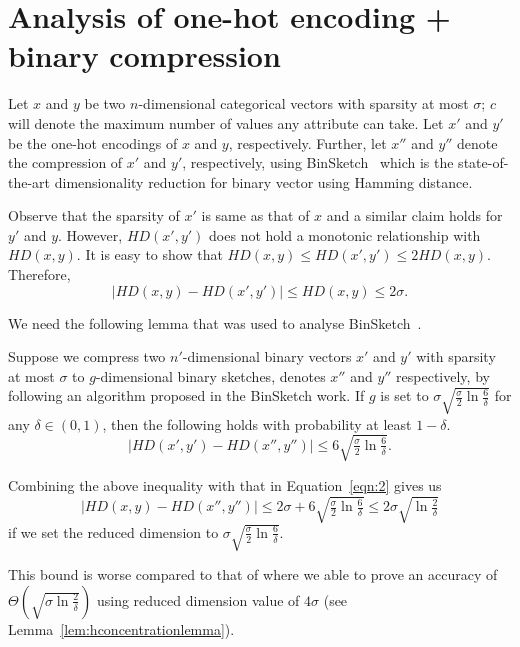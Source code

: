
\section{Analysis of one-hot encoding + binary compression}\label{appendix:OHE+BS}

Let $x$ and $y$ be two $n$-dimensional categorical vectors with sparsity at most $\sigma$; $c$ will denote the maximum number of values any attribute can take. Let $x'$ and $y'$ be the one-hot encodings of $x$ and $y$, respectively. Further, let $x''$ and $y''$ denote the compression of $x'$ and $y'$, respectively, using BinSketch~\cite{ICDM} which is the state-of-the-art dimensionality reduction for binary vector using Hamming distance.

Observe that the sparsity of $x'$ is same as that of $x$ and a similar claim holds for $y'$ and $y$. However, $HD(x',y')$ does not hold a monotonic relationship with $HD(x,y)$. %
It is easy to show that $HD(x,y) \le HD(x',y') \le 2HD(x,y)$. Therefore, 
\begin{equation}
    |HD(x,y) - HD(x',y')| \le HD(x,y) \le 2\sigma. \label{eqn:2}
\end{equation}
    
We need the following lemma that was used to analyse BinSketch~\cite[Lemma~12,Appendix~A]{ICDM}.
\begin{lem}
Suppose we compress two $n'$-dimensional binary vectors $x'$ and $y'$ with sparsity at most $\sigma$ to $g$-dimensional binary sketches, denotes $x''$ and $y''$ respectively, by following an algorithm proposed in the BinSketch work. If $g$ is set to $\sigma\sqrt{\tfrac{\sigma}{2}\ln \frac{6}{\delta}}$ for any $\delta \in (0,1)$, then the following holds with probability at least $1-\delta$.
$$|HD(x',y') - HD(x'',y'')| \le 6 \sqrt{\tfrac{\sigma}{2} \ln \tfrac{6}{\delta}}.$$
\end{lem}

Combining the above inequality with that in Equation~\ref{eqn:2} gives us
$$|HD(x,y)-HD(x'',y'')| \le 2\sigma + 6\sqrt{\tfrac{\sigma}{2} \ln \tfrac{6}{\delta}} \le 2\sigma\sqrt{\ln \tfrac{2}{\delta}}$$
if we set the reduced dimension to $\sigma\sqrt{\tfrac{\sigma}{2}\ln \frac{6}{\delta}}$.

This bound is worse compared to that of \fsketch where we able to prove an accuracy of $\Theta(\sqrt{\sigma\ln \tfrac{2}{\delta}})$ using reduced dimension value of $4\sigma$ (see Lemma~\ref{lem:hconcentrationlemma}).
